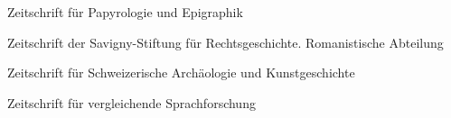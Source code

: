 \begin{footnotesize}
\begin{description}[%
				style=nextline,
				leftmargin=3cm,
				]
\item[ZPE] Zeitschrift für Papyrologie und Epigraphik 
\item[ZSav] Zeitschrift der Savigny-Stiftung für Rechtsgeschichte. Romanistische Abteilung 
\item[ZSchwA] Zeitschrift für Schweizerische Archäologie und Kunstgeschichte 
\item[ZVerglSprF] Zeitschrift für vergleichende Sprachforschung 
\end{description}
\end{footnotesize}